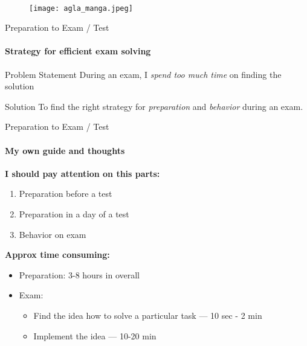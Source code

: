\documentclass[aspectratio=169]{beamer}
\begin{document}
\begin{frame}[t]{}
    \framesubtitle{}
    \begin{figure}[H]
        \centering\texttt{[image: agla\_manga.jpeg]}
        \label{fig:agla_manga.jpeg}
    \end{figure}
\end{frame}


\begin{frame}[t]{Preparation to Exam / Test}
    \framesubtitle{Strategy for efficient exam solving}
    \begin{exampleblock}{Problem Statement}
        During an exam, I \textit{spend too much time} on finding the solution
    \end{exampleblock}
    \begin{alertblock}{Solution}
        To find the right strategy for \textit{preparation} and \textit{behavior} during an exam.
    \end{alertblock}
\end{frame}

\begin{frame}[t]{Preparation to Exam / Test}
    \framesubtitle{My own guide and thoughts}
    \textbf{ I should pay attention on this parts:}
    \begin{enumerate}
        \item Preparation before a test
        \item Preparation in a day of a test
        \item Behavior on exam
    \end{enumerate}

    \textbf{Approx time consuming:}
    \begin{itemize}
        \item Preparation: 3-8 hours in overall
        \item Exam: \begin{itemize}
                  \item Find the idea how to solve a particular task --- 10 sec - 2 min
                  \item Implement the idea — 10-20 min
              \end{itemize}
    \end{itemize}
\end{frame}
\end{document}
